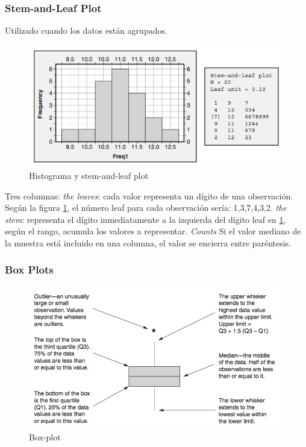 \documentclass[]{article}
\begin{document}
\subsubsection{Stem-and-Leaf Plot}

Utilizado cuando los datos están agrupados.

\begin{figure}[ht!]
	\centering
	\includegraphics[width=120mm]{imagenes/Histograma.png}
	\caption{Histograma y stem-and-leaf plot}
	\label{fig:Histogramaystemandleafplot}
\end{figure}

Tres columnas: \textit{the leaves}: cada valor representa un dígito de una observación. Según la figura \ref{fig:Histogramaystemandleafplot}, el número leaf para cada observación sería: 1,3,7,4,3,2. \textit{the stem}: representa el dígito inmediatamente a la izquierda del dígito leaf en \ref{fig:Histogramaystemandleafplot}, según el rango, acumula los valores a representar. \textit{Counts} Si el valor mediano de la muestra está incluido en una columna, el valor se encierra entre paréntesis. 

\subsubsection{Box Plots}

\begin{figure}[H]
	\centering
	\includegraphics[width=120mm]{imagenes/Box-plot.png}
	\caption{Box-plot}
	\label{fig:Box-plot}
\end{figure}
\end{document}
